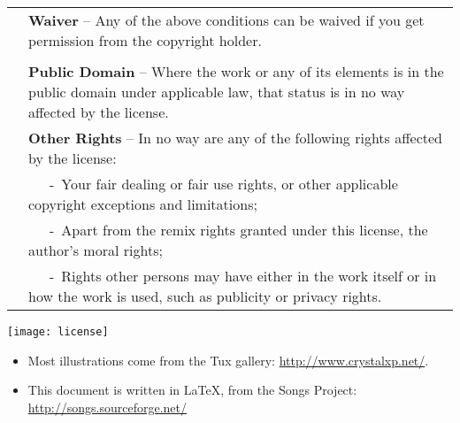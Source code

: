 \begin{tabular}{p{1cm} p{12cm}}
  \\
  & \textbf{Waiver} --
  Any of the above conditions can be waived if you get permission 
  from the copyright holder. \\
  \\
  & \textbf{Public Domain} -- 
  Where the work or any of its elements is in the public domain 
  under applicable law, that status is in no way affected by the license. 
  \\
  & \textbf{Other Rights} -- 
  In no way are any of the following rights affected by the license: \\
  & ~~~-~Your fair dealing or fair use rights, or other applicable 
  copyright exceptions and limitations;\\
  & ~~~-~Apart from the remix rights granted under this license, 
  the author's moral rights;\\
  & ~~~-~Rights other persons may have either in the work itself 
  or in how the work is used, such as publicity or privacy rights.\\
\end{tabular}

\vspace{0.5cm}
\begin{center}
  \texttt{[image: license]}
\end{center}
\vspace{0.5cm}

\begin{itemize}
\item Most illustrations come from the Tux gallery: \url{http://www.crystalxp.net/}.
\item This document is written in \LaTeX, 
  from the Songs Project: \url{http://songs.sourceforge.net/}
\end{itemize}


